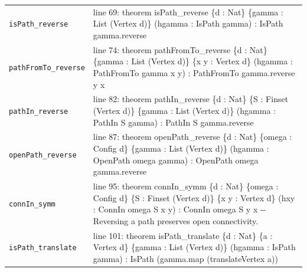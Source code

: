 \documentclass[10pt]{article}
\begin{document}
\begin{longtable}{>{\raggedright\arraybackslash}p{} >{\raggedright\arraybackslash}p{}}
\texttt{isPath\_\allowbreak{}reverse} & {\ttfamily\scriptsize line 69:\allowbreak{} theorem isPath\_\allowbreak{}reverse \{d :\allowbreak{} Nat\} \{gamma :\allowbreak{} List (\allowbreak{}Vertex d)\allowbreak{}\} (\allowbreak{}hgamma :\allowbreak{} IsPath gamma)\allowbreak{} :\allowbreak{} IsPath gamma.\allowbreak{}reverse} \\[0.45em]
\texttt{pathFromTo\_\allowbreak{}reverse} & {\ttfamily\scriptsize line 74:\allowbreak{} theorem pathFromTo\_\allowbreak{}reverse \{d :\allowbreak{} Nat\} \{gamma :\allowbreak{} List (\allowbreak{}Vertex d)\allowbreak{}\} \{x y :\allowbreak{} Vertex d\} (\allowbreak{}hgamma :\allowbreak{} PathFromTo gamma x y)\allowbreak{} :\allowbreak{} PathFromTo gamma.\allowbreak{}reverse y x} \\[0.45em]
\texttt{pathIn\_\allowbreak{}reverse} & {\ttfamily\scriptsize line 82:\allowbreak{} theorem pathIn\_\allowbreak{}reverse \{d :\allowbreak{} Nat\} \{S :\allowbreak{} Finset (\allowbreak{}Vertex d)\allowbreak{}\} \{gamma :\allowbreak{} List (\allowbreak{}Vertex d)\allowbreak{}\} (\allowbreak{}hgamma :\allowbreak{} PathIn S gamma)\allowbreak{} :\allowbreak{} PathIn S gamma.\allowbreak{}reverse} \\[0.45em]
\texttt{openPath\_\allowbreak{}reverse} & {\ttfamily\scriptsize line 87:\allowbreak{} theorem openPath\_\allowbreak{}reverse \{d :\allowbreak{} Nat\} \{omega :\allowbreak{} Config d\} \{gamma :\allowbreak{} List (\allowbreak{}Vertex d)\allowbreak{}\} (\allowbreak{}hgamma :\allowbreak{} OpenPath omega gamma)\allowbreak{} :\allowbreak{} OpenPath omega gamma.\allowbreak{}reverse} \\[0.45em]
\texttt{connIn\_\allowbreak{}symm} & {\ttfamily\scriptsize line 95:\allowbreak{} theorem connIn\_\allowbreak{}symm \{d :\allowbreak{} Nat\} \{omega :\allowbreak{} Config d\} \{S :\allowbreak{} Finset (\allowbreak{}Vertex d)\allowbreak{}\} \{x y :\allowbreak{} Vertex d\} (\allowbreak{}hxy :\allowbreak{} ConnIn omega S x y)\allowbreak{} :\allowbreak{} ConnIn omega S y x -\allowbreak{}-\allowbreak{} Reversing a path preserves open connectivity.\allowbreak{}} \\[0.45em]
\texttt{isPath\_\allowbreak{}translate} & {\ttfamily\scriptsize line 101:\allowbreak{} theorem isPath\_\allowbreak{}translate \{d :\allowbreak{} Nat\} \{a :\allowbreak{} Vertex d\} \{gamma :\allowbreak{} List (\allowbreak{}Vertex d)\allowbreak{}\} (\allowbreak{}hgamma :\allowbreak{} IsPath gamma)\allowbreak{} :\allowbreak{} IsPath (\allowbreak{}gamma.\allowbreak{}map (\allowbreak{}translateVertex a)\allowbreak{})\allowbreak{}} \\[0.45em]

\end{longtable}
\end{document}
